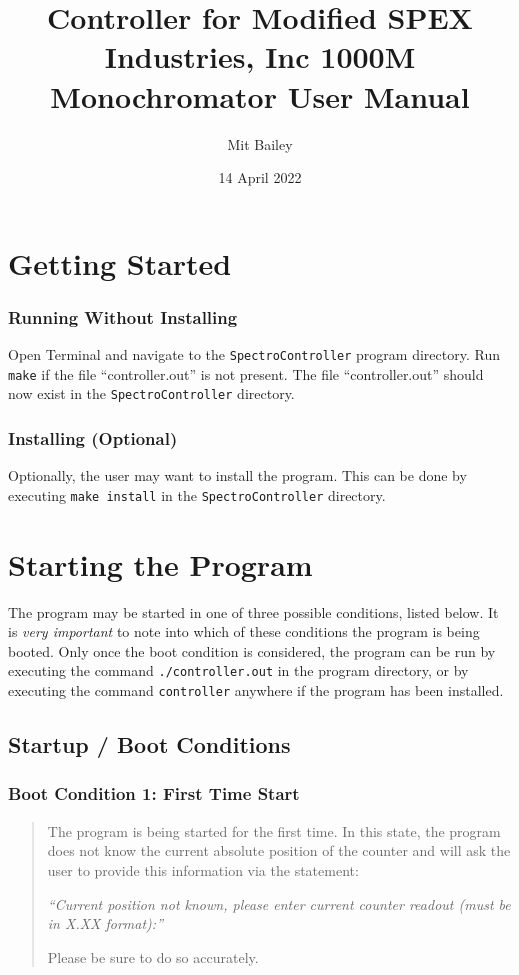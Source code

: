 \documentclass{article}
\title{Controller for Modified SPEX Industries, Inc 1000M Monochromator User Manual}
\author{Mit Bailey}
\date{14 April 2022}
\begin{document}
\maketitle
\newpage

\tableofcontents
\newpage

\section{Getting Started} \label{section:gettingstarted}

\subsubsection{Running Without Installing}
Open Terminal and navigate to the \verb|SpectroController| program directory. Run \verb|make| if the file ``controller.out'' is not present. The file ``controller.out'' should now exist in the \verb|SpectroController| directory.

\subsubsection{Installing (Optional)}
Optionally, the user may want to install the program. This can be done by executing \verb|make install| in the \verb|SpectroController| directory.

\section{Starting the Program} \label{section:startingtheprogram}

The program may be started in one of three possible conditions, listed below. It is \emph{very important} to note into which of these conditions the program is being booted. Only once the boot condition is considered, the program can be run by executing the command \verb|./controller.out| in the program directory, or by executing the command \verb|controller| anywhere if the program has been installed.

\subsection{Startup / Boot Conditions} \label{subsection:startupbootconditions}
\subsubsection{Boot Condition 1: First Time Start} \label{subsubsection:bootcon1}
\begin{quote}
    The program is being started for the first time. In this state, the program does not know the current absolute position of the counter and will ask the user to provide this information via the statement:
    
    \emph{“Current position not known, please enter current counter readout (must be in X.XX format):”}
    
    Please be sure to do so accurately.
\end{quote}
\end{document}
